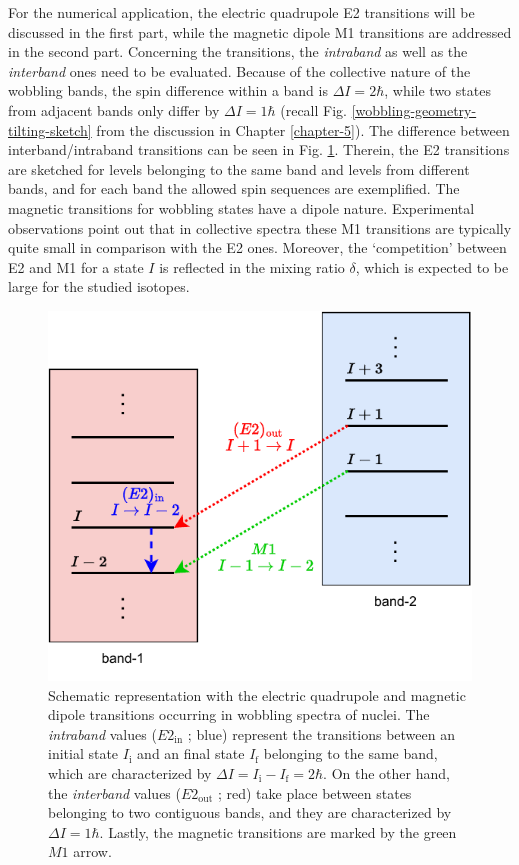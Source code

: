 For the numerical application, the electric quadrupole E2 transitions will be discussed in the first part, while the magnetic dipole M1 transitions are addressed in the second part. Concerning the transitions, the \emph{intraband} as well as the \emph{interband} ones need to be evaluated. Because of the collective nature of the wobbling bands, the spin difference within a band is $\Delta I=2\hbar$, while two states from adjacent bands only differ by $\Delta I=1\hbar$ (recall Fig. \ref{wobbling-geometry-tilting-sketch} from the discussion in Chapter \ref{chapter-5}). The difference between interband/intraband transitions can be seen in Fig. \ref{schematic-interband-intraband-E2}. Therein, the E2 transitions are sketched for levels belonging to the same band and levels from different bands, and for each band the allowed spin sequences are exemplified. The magnetic transitions for wobbling states have a dipole nature. Experimental observations point out that in collective spectra these M1 transitions are typically quite small in comparison with the E2 ones. Moreover, the `competition' between E2 and M1 for a state $I$ is reflected in the mixing ratio $\delta$, which is expected to be large for the studied isotopes. 
\begin{figure}
    \centering
    \includegraphics[scale=1.1]{Chapters/Figures/transitions-wobbling-states.pdf}
    \caption{Schematic representation with the electric quadrupole and magnetic dipole transitions occurring in wobbling spectra of nuclei. The \emph{intraband} values ($E2_\text{in}$ ; blue) represent the transitions between an initial state $I_\text{i}$ and an final state $I_\text{f}$ belonging to the same band, which are characterized by $\Delta I=I_\text{i}-I_\text{f}=2\hbar$. On the other hand, the \emph{interband} values ($E2_\text{out}$ ; red) take place between states belonging to two contiguous bands, and they are characterized by $\Delta I=1\hbar$. Lastly, the magnetic transitions are marked by the green $M1$ arrow.}
    \label{schematic-interband-intraband-E2}
\end{figure}

